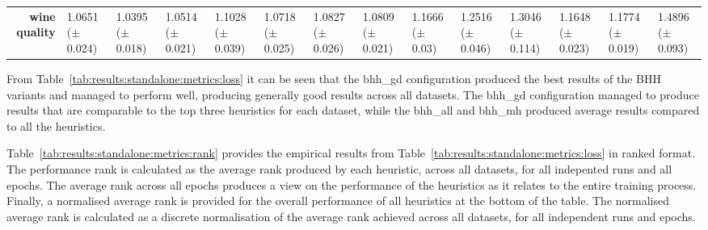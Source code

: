 \begin{sidewaystable}[htbp]
{\begin{tabular}{r|lll|l|l|l|l|l|lllll}
                  \textbf{wine quality}               & \cellcolor[rgb]{ .631,  .816,  .494}1.0651 ($\pm$0.024)                        & \cellcolor[rgb]{ .388,  .745,  .482}1.0395 ($\pm$0.018) & \cellcolor[rgb]{ .502,  .776,  .486}1.0514 ($\pm$0.021) & \cellcolor[rgb]{ 1,  .922,  .518}1.1028 ($\pm$0.039)    & \cellcolor[rgb]{ .698,  .831,  .498}1.0718 ($\pm$0.025) & \cellcolor[rgb]{ .804,  .863,  .506}1.0827 ($\pm$0.026) & \cellcolor[rgb]{ .788,  .859,  .502}1.0809 ($\pm$0.021) & \cellcolor[rgb]{ .996,  .839,  .502}1.1666 ($\pm$0.03)  & \cellcolor[rgb]{ .992,  .725,  .482}1.2516 ($\pm$0.046) & \cellcolor[rgb]{ .988,  .659,  .467}1.3046 ($\pm$0.114) & \cellcolor[rgb]{ .996,  .843,  .502}1.1648 ($\pm$0.023) & \cellcolor[rgb]{ .996,  .824,  .502}1.1774 ($\pm$0.019) & \cellcolor[rgb]{ .973,  .412,  .42}1.4896 ($\pm$0.093)  \\
                  \cmidrule{5-5}\cmidrule{7-7}\cmidrule{9-9}\end{tabular}%
      }
\end{sidewaystable}%

From Table~\ref{tab:results:standalone:metrics:loss} it can be seen that the bhh\_gd configuration produced the best results of the \acs{BHH} variants and managed to perform well, producing generally good results across all datasets. The bhh\_gd configuration managed to produce results that are comparable to the top three heuristics for each dataset, while the bhh\_all and bhh\_mh produced average results compared to all the heuristics.

Table~\ref{tab:results:standalone:metrics:rank} provides the empirical results from Table~\ref{tab:results:standalone:metrics:loss} in ranked format. The performance rank is calculated as the average rank produced by each heuristic, across all datasets, for all indepented runs and all epochs. The average rank across all epochs produces a view on the performance of the heuristics as it relates to the entire training process. Finally, a normalised average rank is provided for the overall performance of all heuristics at the bottom of the table. The normalised average rank is calculated as a discrete normalisation of the average rank achieved across all datasets, for all independent runs and epochs.


